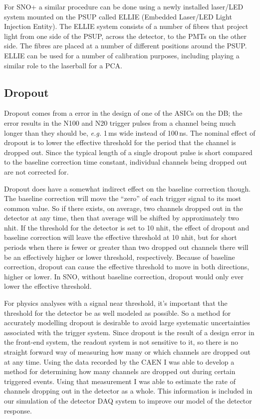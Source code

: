 For SNO+ a similar procedure can be done using a newly installed laser/LED system
mounted on the PSUP called ELLIE (Embedded Laser/LED Light Injection Entity).
The ELLIE system consists of a number of fibres that project light from one
side of the PSUP, across the detector, to the PMTs on the other side.
The fibres are placed at a number of different positions around the PSUP\@.
ELLIE can be used for a number of calibration purposes, including playing a
similar role to the laserball for a PCA\@.

\subsection{Dropout}
\label{sec:dropout}
Dropout comes from a error in the design of one of the
ASICs on the DB\@;
the error results in the N100 and N20 trigger pulses from
a channel being much longer than they should be, \textit{e.g.} 1\,ms wide
instead of 100\,ns.
The nominal effect of dropout is to lower the effective threshold for the period
that the channel is dropped out.
Since the typical length of a single dropout pulse is short compared to the
baseline correction time constant, individual channels being dropped out
are not corrected for.

Dropout does have a somewhat indirect effect on the baseline correction though.
The baseline correction will move the ``zero'' of each trigger signal to
its most common value.
So if there exists, on average, two channels dropped out
in the detector at any time, then that average will be shifted by approximately
two nhit.
If the threshold for the detector is set to 10 nhit,
the effect of dropout and baseline correction will leave the effective threshold
at 10 nhit, but for short periods when there is fewer or greater than two dropped out
channels there will be an effectively higher or lower threshold, respectively.
Because of baseline correction, dropout can cause the effective threshold to move
in both directions, higher or lower.
In SNO, without baseline correction, dropout would only ever lower the effective threshold.


For physics analyses with a signal near threshold, it's important that
the threshold for the detector be as well modeled as possible.
So a method for accurately modelling dropout is desirable to avoid large
systematic uncertainties associated with the trigger system.
Since dropout is the result of a design error in the front-end system, the readout system
is not sensitive to it, so there is no straight forward way of measuring how many
or which channels are dropped out at any time.
Using the data recorded by the CAEN I was able to develop a method for determining
how many channels are dropped out during certain triggered events.
Using that measurement I was able to estimate the rate of channels dropping out
in the detector as a whole.
This information is included in our simulation of the detector DAQ system to improve
our model of the detector response.

